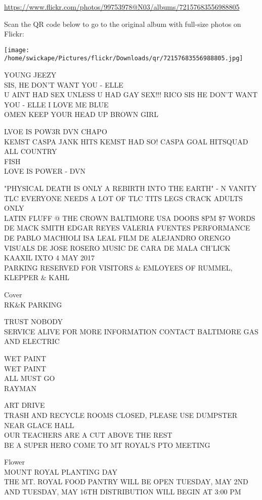 \documentclass[10pt,letterpaper]{article}
\begin{document}
\url{https://www.flickr.com/photos/99753978@N03/albums/72157683556988805}

Scan the QR code below to go to the original album with full-size photos on Flickr:

\texttt{[image: /home/swickape/Pictures/flickr/Downloads/qr/72157683556988805.jpg]}
\pagebreak

YOUNG JEEZY\\
SIS, HE DON'T WANT YOU {-} ELLE\\
U AINT HAD SEX UNLESS U HAD GAY SEX!!! RICO SIS HE DON'T WANT YOU {-} ELLE I LOVE ME BLUE\\
OMEN KEEP YOUR HEAD UP BROWN GIRL

LVOE IS POW3R DVN CHAPO\\
KEMST CASPA JANK HITS KEMST HAD SO! CASPA GOAL HITSQUAD ALL COUNTRY\\
FISH\\
LOVE IS POWER {-} DVN

"PHYSICAL DEATH IS ONLY A REBIRTH INTO THE EARTH" {-} N VANITY\\
TLC EVERYONE NEEDS A LOT OF TLC TITS LEGS CRACK ADULTS ONLY\\
LATIN FLUFF @ THE CROWN BALTIMORE USA DOORS 8PM \$7 WORDS DE MACK SMITH EDGAR REYES VALERIA FUENTES PERFORMANCE DE PABLO MACHIOLI ISA LEAL FILM DE ALEJANDRO ORENGO VISUALS DE JOSE ROSERO MUSIC DE CARA DE MALA CH'LICK KAAXIL IXTO 4 MAY 2017\\
PARKING RESERVED FOR VISITORS \& EMLOYEES OF RUMMEL, KLEPPER \& KAHL

Cover\\
RK\&K PARKING

TRUST NOBODY\\
SERVICE ALIVE FOR MORE INFORMATION CONTACT BALTIMORE GAS AND ELECTRIC

WET PAINT\\
WET PAINT\\
ALL MUST GO\\
RAYMAN

ART DRIVE\\
TRASH AND RECYCLE ROOMS CLOSED, PLEASE USE DUMPSTER NEAR GLACE HALL\\
OUR TEACHERS ARE A CUT ABOVE THE REST\\
BE A SUPER HERO COME TO MT ROYAL'S PTO MEETING

Flower\\
MOUNT ROYAL PLANTING DAY\\
THE MT. ROYAL FOOD PANTRY WILL BE OPEN TUESDAY, MAY 2ND AND TUESDAY, MAY 16TH DISTRIBUTION WILL BEGIN AT 3:00 PM
\end{document}
